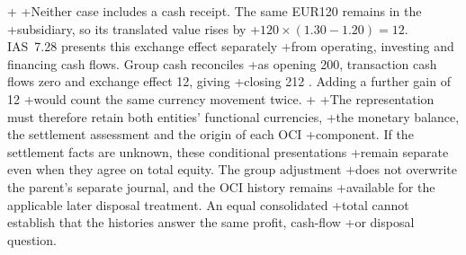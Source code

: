 +
+Neither case includes a cash receipt. The same EUR120 remains in the
+subsidiary, so its translated value rises by
+$120\times(1.30-1.20)=12$. IAS~7.28 presents this exchange effect separately
+from operating, investing and financing cash flows. Group cash reconciles
+as opening 200, transaction cash flows zero and exchange effect 12, giving
+closing 212 \citep[IAS~7.25--28]{eu20231803}. Adding a further gain of 12
+would count the same currency movement twice.
+
+The representation must therefore retain both entities' functional currencies,
+the monetary balance, the settlement assessment and the origin of each OCI
+component. If the settlement facts are unknown, these conditional presentations
+remain separate even when they agree on total equity. The group adjustment
+does not overwrite the parent's separate journal, and the OCI history remains
+available for the applicable later disposal treatment. An equal consolidated
+total cannot establish that the histories answer the same profit, cash-flow
+or disposal question.
